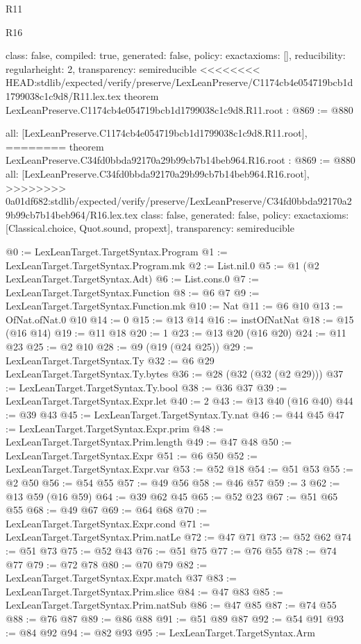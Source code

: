 \begin{lexlean}{R11}
\begin{lexlean}{R16}
\begin{coremodule}
{{{{{  class: false,
  compiled: true,
  generated: false,
  policy: exact{axioms: []},
  reducibility: regular{height: 2},
  transparency: semireducible
}
<<<<<<<< HEAD:stdlib/expected/verify/preserve/LexLeanPreserve/C1174cb4e054719bcb1d1799038c1c9d8/R11.lex.tex
theorem LexLeanPreserve.C1174cb4e054719bcb1d1799038c1c9d8.R11.root : @869 := @880 {
  all: [LexLeanPreserve.C1174cb4e054719bcb1d1799038c1c9d8.R11.root],
========
theorem LexLeanPreserve.C34fd0bbda92170a29b99cb7b14beb964.R16.root : @869 := @880 {
  all: [LexLeanPreserve.C34fd0bbda92170a29b99cb7b14beb964.R16.root],
>>>>>>>> 0a01df682:stdlib/expected/verify/preserve/LexLeanPreserve/C34fd0bbda92170a29b99cb7b14beb964/R16.lex.tex
  class: false,
  generated: false,
  policy: exact{axioms: [Classical.choice, Quot.sound, propext]},
  transparency: semireducible
}

@0 := LexLeanTarget.TargetSyntax.Program
@1 := LexLeanTarget.TargetSyntax.Program.mk
@2 := List.nil.{0}
@5 := @1 (@2 LexLeanTarget.TargetSyntax.Adt)
@6 := List.cons.{0}
@7 := LexLeanTarget.TargetSyntax.Function
@8 := @6 @7
@9 := LexLeanTarget.TargetSyntax.Function.mk
@10 := Nat
@11 := @6 @10
@13 := OfNat.ofNat.{0} @10
@14 := 0
@15 := @13 @14
@16 := instOfNatNat
@18 := @15 (@16 @14)
@19 := @11 @18
@20 := 1
@23 := @13 @20 (@16 @20)
@24 := @11 @23
@25 := @2 @10
@28 := @9 (@19 (@24 @25))
@29 := LexLeanTarget.TargetSyntax.Ty
@32 := @6 @29 LexLeanTarget.TargetSyntax.Ty.bytes
@36 := @28 (@32 (@32 (@2 @29)))
@37 := LexLeanTarget.TargetSyntax.Ty.bool
@38 := @36 @37
@39 := LexLeanTarget.TargetSyntax.Expr.let
@40 := 2
@43 := @13 @40 (@16 @40)
@44 := @39 @43
@45 := LexLeanTarget.TargetSyntax.Ty.nat
@46 := @44 @45
@47 := LexLeanTarget.TargetSyntax.Expr.prim
@48 := LexLeanTarget.TargetSyntax.Prim.length
@49 := @47 @48
@50 := LexLeanTarget.TargetSyntax.Expr
@51 := @6 @50
@52 := LexLeanTarget.TargetSyntax.Expr.var
@53 := @52 @18
@54 := @51 @53
@55 := @2 @50
@56 := @54 @55
@57 := @49 @56
@58 := @46 @57
@59 := 3
@62 := @13 @59 (@16 @59)
@64 := @39 @62 @45
@65 := @52 @23
@67 := @51 @65 @55
@68 := @49 @67
@69 := @64 @68
@70 := LexLeanTarget.TargetSyntax.Expr.cond
@71 := LexLeanTarget.TargetSyntax.Prim.natLe
@72 := @47 @71
@73 := @52 @62
@74 := @51 @73
@75 := @52 @43
@76 := @51 @75
@77 := @76 @55
@78 := @74 @77
@79 := @72 @78
@80 := @70 @79
@82 := LexLeanTarget.TargetSyntax.Expr.match @37
@83 := LexLeanTarget.TargetSyntax.Prim.slice
@84 := @47 @83
@85 := LexLeanTarget.TargetSyntax.Prim.natSub
@86 := @47 @85
@87 := @74 @55
@88 := @76 @87
@89 := @86 @88
@91 := @51 @89 @87
@92 := @54 @91
@93 := @84 @92
@94 := @82 @93
@95 := LexLeanTarget.TargetSyntax.Arm
}}}}}
\end{coremodule}
\end{lexlean}
\end{lexlean}
